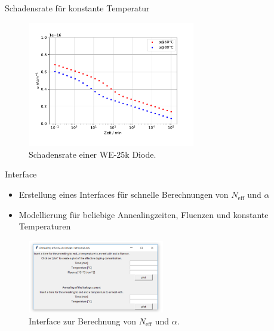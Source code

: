 \documentclass[aspectratio=43, 10pt]{beamer}
\begin{document}
\begin{frame}{Schadensrate für konstante Temperatur}
  \begin{figure}
      \includegraphics[width=0.65\textwidth]{images/damage.PDF}
  \caption{Schadensrate einer WE-25k Diode.}
  \end{figure}
\end{frame}

\begin{frame}{Interface}
  \begin{itemize}
    \item Erstellung eines Interfaces für schnelle Berechnungen von $N_{\mathrm{eff}}$ und $\alpha$
    \item Modellierung für beliebige Annealingzeiten, Fluenzen und konstante Temperaturen
  \end{itemize}
  \begin{figure}
      \includegraphics[width=0.53\textwidth]{images/interface.PNG}
  \caption{Interface zur Berechnung von $N_{\mathrm{eff}}$ und $\alpha$.}
  \end{figure}
\end{frame}
\end{document}
